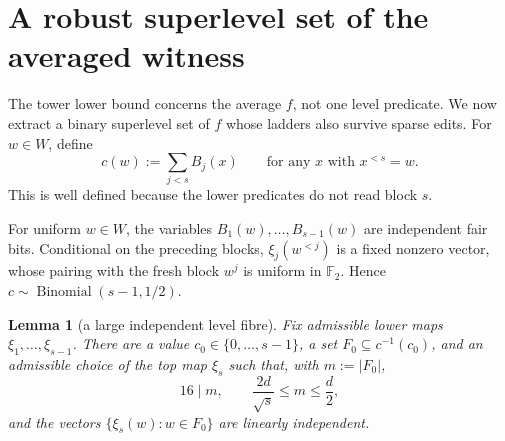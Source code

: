 \documentclass[11pt]{article}
\theoremstyle{plain}
\newtheorem{lemma}[theorem]{Lemma}
\theoremstyle{definition}
\numberwithin{theorem}{section}
\newcommand{\F}{\mathbb{F}}
\newcommand{\abs}[1]{\lvert #1\rvert}
\begin{document}
\section{A robust superlevel set of the averaged witness}\label{sec:witness}

The tower lower bound concerns the average $f$, not one level predicate.  We
now extract a binary superlevel set of $f$ whose ladders also survive sparse
edits.  For $w\in W$, define
\[
  c(w):=\sum_{j<s}B_j(x)
  \qquad\text{for any $x$ with $x^{<s}=w$}.
\]
This is well defined because the lower predicates do not read block $s$.

For uniform $w\in W$, the variables $B_1(w),\dots,B_{s-1}(w)$ are
independent fair bits.  Conditional on the preceding blocks,
$\xi_j(w^{<j})$ is a fixed nonzero vector, whose pairing with the fresh block
$w^j$ is uniform in $\F_2$.  Hence
$c\sim\operatorname{Binomial}(s-1,1/2)$.

\begin{lemma}[a large independent level fibre]\label{lem:independent-fibre}
Fix admissible lower maps $\xi_1,\dots,\xi_{s-1}$.  There are a value
$c_0\in\{0,\dots,s-1\}$, a set $F_0\subseteq c^{-1}(c_0)$, and an admissible
choice of the top map $\xi_s$ such that, with $m:=\abs{F_0}$,
\[
  16\mid m,\qquad \frac{2d}{\sqrt{s}}\le m\le\frac d2,
\]
and the vectors $\{\xi_s(w):w\in F_0\}$ are linearly independent.
\end{lemma}
\end{document}
